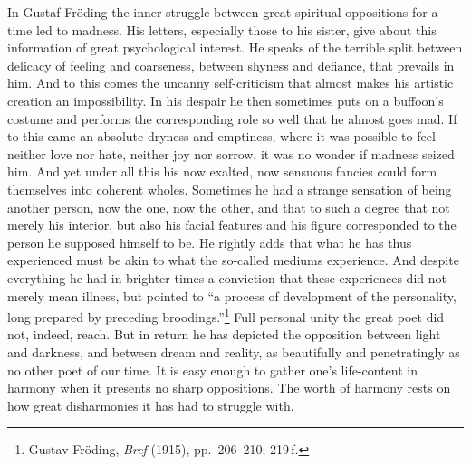 \documentclass[12pt]{book}
\newcommand{\opage}[1]{\marginnote{\footnotesize\textit{[#1]}}}
\begin{document}
In Gustaf Fröding the inner struggle between great spiritual oppositions for a time led to madness.
His letters, especially those to his sister, give about this information of great psychological
interest. He speaks of the terrible split between delicacy of feeling and coarseness, between shyness
and defiance, that prevails in him. And to this comes the uncanny self-criticism that almost makes
his artistic creation an impossibility. In his despair he then sometimes puts on a buffoon's costume
and performs the \opage{38}corresponding role so well that he almost goes mad. If to this came an absolute
dryness and emptiness, where it was possible to feel neither love nor hate, neither joy nor sorrow,
it was no wonder if madness seized him. And yet under all this his now exalted, now sensuous fancies
could form themselves into coherent wholes. Sometimes he had a strange sensation of being another
person, now the one, now the other, and that to such a degree that not merely his interior, but also
his facial features and his figure corresponded to the person he supposed himself to be. He rightly
adds that what he has thus experienced must be akin to what the so-called mediums experience. And
despite everything he had in brighter times a conviction that these experiences did not merely mean
illness, but pointed to ``a process of development of the personality, long prepared by preceding
broodings.''\footnote{Gustav Fröding, \textit{Bref} (1915), pp.\ 206--210; 219\,f.} Full personal
unity the great poet did not, indeed, reach. But in return he has depicted the opposition between
light and darkness, and between dream and reality, as beautifully and penetratingly as no other poet
of our time. It is easy enough to gather one's life-content in harmony when it presents no sharp
oppositions. The worth of harmony rests on how great disharmonies it has had to struggle with.
\end{document}
